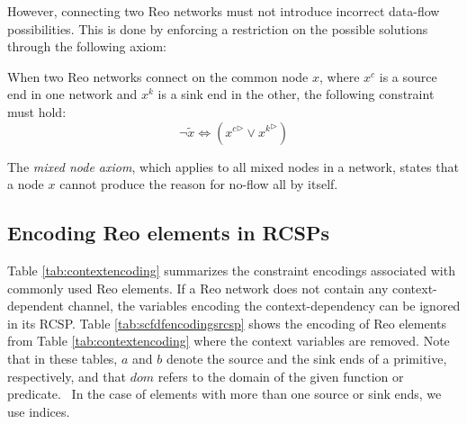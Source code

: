 However, connecting two Reo networks must not introduce incorrect data-flow possibilities. This is done by enforcing a restriction on the possible solutions through the following axiom:
\begin{BehAxiom}\label{ax:mixednode}
When two Reo networks connect on the common node $x$, where $x^c$ is a source end in one network and $x^k$ is a sink end in the other, the following constraint must hold:
$$ \neg \tilde{x} \Leftrightarrow ({x^c}^\triangleright \vee {x^k}^\triangleright)$$
\end{BehAxiom}
\noindent
The \emph{mixed node axiom}, which applies to all mixed nodes in a network, states that a node $x$ cannot produce the reason for no-flow all by itself. 
\subsection{Encoding Reo elements in RCSPs}
Table \ref{tab:contextencoding} summarizes the constraint encodings associated with commonly used Reo elements. If a Reo network does not contain any context-dependent channel, the variables encoding the context-dependency can be ignored in its RCSP. Table \ref{tab:scfdfencodingsrcsp} shows the encoding of Reo elements from Table \ref{tab:contextencoding} where the context variables are removed. Note that in these tables, $a$ and $b$ denote the source and the sink ends of a primitive, respectively, and that $dom$ refers to the domain of the given function or predicate. %
~In the case of elements with more than one source or sink ends, we use indices.

